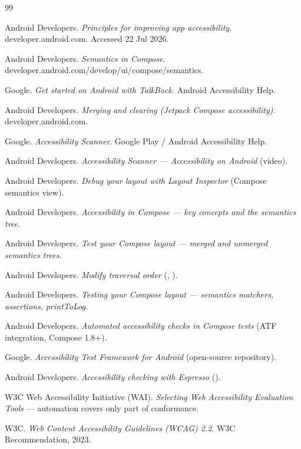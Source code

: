 \begin{thebibliography}{99}

 Android Developers.
\emph{Principles for improving app accessibility}. developer.android.com. Accessed 22 Jul 2026.

 Android Developers.
\emph{Semantics in Compose}. developer.android.com/develop/ui/compose/semantics.

 Google.
\emph{Get started on Android with TalkBack}. Android Accessibility Help.

 Android Developers.
\emph{Merging and clearing (Jetpack Compose accessibility)}. developer.android.com.

 Google.
\emph{Accessibility Scanner}. Google Play / Android Accessibility Help.

 Android Developers.
\emph{Accessibility Scanner --- Accessibility on Android} (video).

 Android Developers.
\emph{Debug your layout with Layout Inspector} (Compose semantics view).

 Android Developers.
\emph{Accessibility in Compose --- key concepts and the semantics tree}.

 Android Developers.
\emph{Test your Compose layout --- merged and unmerged semantics trees}.

 Android Developers.
\emph{Modify traversal order} (, ).

 Android Developers.
\emph{Testing your Compose layout --- semantics matchers, assertions, printToLog}.

 Android Developers.
\emph{Automated accessibility checks in Compose tests} (ATF integration, Compose 1.8+).

 Google.
\emph{Accessibility Test Framework for Android} (open-source repository).

 Android Developers.
\emph{Accessibility checking with Espresso} ().

 W3C Web Accessibility Initiative (WAI).
\emph{Selecting Web Accessibility Evaluation Tools} --- automation covers only part of conformance.

 W3C.
\emph{Web Content Accessibility Guidelines (WCAG) 2.2}. W3C Recommendation, 2023.


\end{thebibliography}
